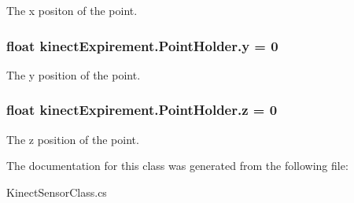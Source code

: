 The x positon of the point. 

\subsubsection[{\texorpdfstring{y}{y}}]{\setlength{\rightskip}{0pt plus 5cm}float kinect\+Expirement.\+Point\+Holder.\+y = 0}\hypertarget{classkinect_expirement_1_1_point_holder_a8e1920f1bd56b015aeae9f19a6f0c5e6}{}\label{classkinect_expirement_1_1_point_holder_a8e1920f1bd56b015aeae9f19a6f0c5e6}


The y position of the point. 

\subsubsection[{\texorpdfstring{z}{z}}]{\setlength{\rightskip}{0pt plus 5cm}float kinect\+Expirement.\+Point\+Holder.\+z = 0}\hypertarget{classkinect_expirement_1_1_point_holder_aa89b5a93efd8f6f6eb033ea7160c5d97}{}\label{classkinect_expirement_1_1_point_holder_aa89b5a93efd8f6f6eb033ea7160c5d97}


The z position of the point. 



The documentation for this class was generated from the following file\+:\begin{DoxyCompactItemize}
\item 
Kinect\+Sensor\+Class.\+cs\end{DoxyCompactItemize}
